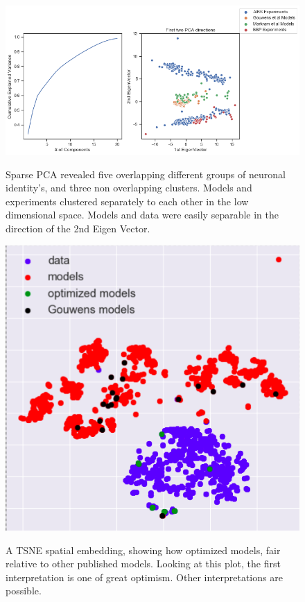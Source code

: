 \begin{figure}    
\begin{center} \includegraphics[width=1.0\linewidth]{figures/cortical_model_data_agreement_52_1}
\label{fig:}
\end{center}
\caption[Sparse PCA, variance explained, 1st and 2nd Principal Components]{Sparse PCA revealed five overlapping different groups of neuronal identity's, and three non overlapping clusters. Models and experiments clustered separately to each other in the low dimensional space. Models and data were easily separable in the direction of the 2nd Eigen Vector.}
\label{fig:pca_data_points}
\end{figure}    



\begin{figure}    
\begin{center} \includegraphics[width=0.75\linewidth]{figures/optimized_model_fit_onto_big_distribution.png}
    \label{fig:}
\end{center}
\caption[A TSNE Low Spatial Embedding Optimized Models]{A TSNE spatial embedding, showing how optimized models, fair relative to other published models. Looking at this plot, the first interpretation is one of great optimism. Other interpretations are possible.}
\label{fig:tsne_opt_model_points}
\end{figure}    

